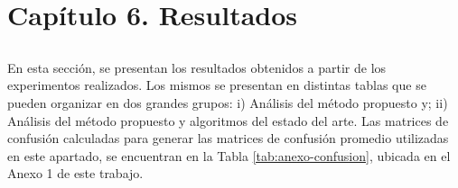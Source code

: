 \chapter*{Capítulo 6. \textbf{Resultados}}\label{ch:resultados}

\section*{}
\addtocounter{section}{1}
\setcounter{subsection}{0}

En esta sección, se presentan los resultados obtenidos a partir de los experimentos realizados. Los mismos se presentan en distintas tablas que se pueden organizar en dos grandes grupos: i) Análisis del método propuesto y; ii) Análisis del método propuesto y algoritmos del estado del arte. Las matrices de confusión calculadas para generar las matrices de confusión promedio utilizadas en este apartado, se encuentran en la Tabla \ref{tab:anexo-confusion}, ubicada en el Anexo 1 de este trabajo.






